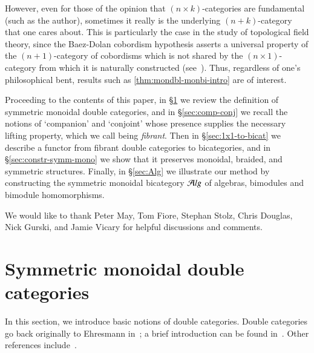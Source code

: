 \documentclass{amsart}
\begin{document}

However, even for those of the opinion that $(n\times k)$-categories
are fundamental (such as the author), sometimes it really is the
underlying $(n+k)$-category that one cares about.  This is
particularly the case in the study of topological field theory, since
the Baez-Dolan cobordism hypothesis asserts a universal property of
the $(n+1)$-category of cobordisms which is not shared by the
$(n\times 1)$-category from which it is naturally constructed
(see~\cite{lurie:tft}).  Thus, regardless of one's philosophical bent,
results such as \autoref{thm:mondbl-monbi-intro} are of interest.

Proceeding to the contents of this paper, in
\S\ref{sec:symm-mono-double} we review the definition of symmetric
monoidal double categories, and in \S\ref{sec:comp-conj} we recall the
notions of `companion' and `conjoint' whose presence supplies the
necessary lifting property, which we call being \emph{fibrant}.  Then
in \S\ref{sec:1x1-to-bicat} we describe a functor from fibrant double
categories to bicategories, and in \S\ref{sec:constr-symm-mono} we
show that it preserves monoidal, braided, and symmetric structures. Finally, in \S\ref{sec:Alg} we illustrate our method by constructing the symmetric monoidal bicategory ${\mathcal{A}}lg$ of algebras, bimodules and bimodule homomorphisms.

We would like to thank Peter May, Tom Fiore, Stephan Stolz, Chris
Douglas, Nick Gurski, and Jamie Vicary for helpful discussions and comments.


\section{Symmetric monoidal double categories}
\label{sec:symm-mono-double}

In this section, we introduce basic notions of double categories.
Double categories go back originally to Ehresmann
in~\cite{ehresmann:cat-str}; a brief introduction can be found
in~\cite{ks:r2cats}.  Other references
include~\cite{multi_funct_i,gp:double-limits,gp:double-adjoints}.
\end{document}
